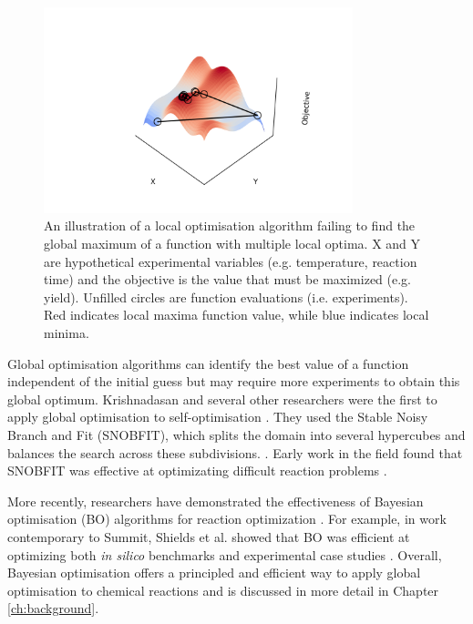 \begin{figure}
    \centering
    \includegraphics[width=0.8\textwidth]{gfx/Chapter03/local_optimzation.png}
    \caption{An illustration of a local optimisation algorithm failing to find the global maximum of a function with multiple local optima. X and Y are hypothetical experimental variables (e.g. temperature, reaction time) and the objective is the value that must be maximized (e.g. yield). Unfilled circles are function evaluations (i.e. experiments). Red indicates local maxima function value, while blue indicates local minima.}
    \label{fig:local-optimisation}
\end{figure}
 
Global optimisation algorithms can identify the best value of a function independent of the initial guess but may require more experiments to obtain this global optimum. Krishnadasan and several other researchers were the first to apply global optimisation to self-optimisation \cite{Holmes2016b, Krishnadasan2007, McMullen2010a}. They used the Stable Noisy Branch and Fit (SNOBFIT), which splits the domain into several hypercubes and balances the search across these subdivisions. \cite{Huyer2008}. Early work in the field found that SNOBFIT was effective at optimizating difficult reaction problems \cite{McMullen2010a}.

More recently, researchers have demonstrated the effectiveness of Bayesian optimisation (BO) algorithms  for reaction optimization \cite{Schweidtmann2018, Amar2019, Hase2020, Shields2021, Manson2021}. For example, in work contemporary to Summit, Shields et al. showed that BO was efficient at optimizing both \textit{in silico} benchmarks and experimental case studies \cite{Shields2021}. Overall, Bayesian optimisation offers a principled and efficient way to apply global optimisation to chemical reactions and is discussed in more detail in Chapter \ref{ch:background}.

